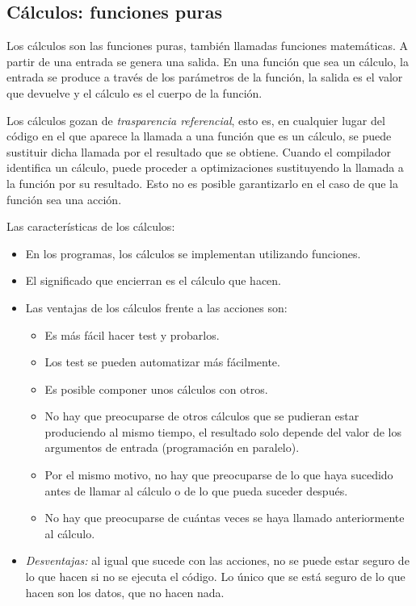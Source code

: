 \subsection{Cálculos: funciones puras}
Los cálculos son las funciones  puras, también llamadas funciones matemáticas. A partir de una entrada se genera una salida. En una función que sea un cálculo, la entrada se produce a través de los parámetros de la función, la salida es el valor que devuelve y el cálculo es el cuerpo de la función. 

Los cálculos gozan de \textit{trasparencia referencial}, esto es, en cualquier lugar del código en el que aparece la llamada a una función que es un cálculo, se puede sustituir dicha llamada por el resultado que se obtiene. Cuando el compilador identifica un cálculo, puede proceder a optimizaciones sustituyendo la llamada a la función por su resultado. Esto no es posible garantizarlo en el caso de que la función sea una acción. 

Las características de los cálculos:

\begin{itemize}
   \item En los programas, los cálculos se implementan utilizando funciones.
   \item El significado que encierran es el cálculo que hacen.
   \item Las ventajas de los cálculos frente a las acciones son:
   \begin{itemize}
      \item Es más fácil hacer test y probarlos.
      \item Los test se pueden automatizar más fácilmente.
      \item Es posible componer unos cálculos con otros.
      \item No hay que preocuparse de otros cálculos que se pudieran estar produciendo al mismo tiempo, el resultado solo depende del valor de los argumentos de entrada (programación en paralelo).
      \item Por el mismo motivo, no hay que preocuparse de lo que haya sucedido antes de llamar al cálculo o de lo que pueda suceder después.
      \item No hay que preocuparse de cuántas veces se haya llamado anteriormente al cálculo.
   \end{itemize}
   \item \textit{Desventajas:} al igual que sucede con las acciones, no se  puede estar seguro de lo que hacen si no se ejecuta el código. Lo único que se está seguro de lo que hacen son los datos, que no hacen nada.
\end{itemize}

